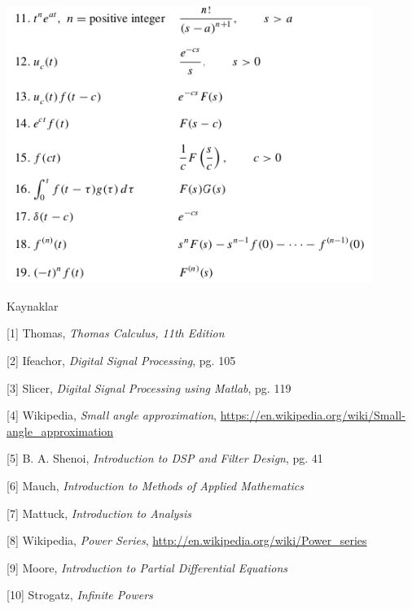 \documentclass[12pt,fleqn]{article}\usepackage{../../common}
\begin{document}
\includegraphics[height=9cm]{lap_2.png}

Kaynaklar 

[1] Thomas, {\em Thomas Calculus, 11th Edition}

[2] Ifeachor, {\em Digital Signal Processing}, pg. 105

[3] Slicer, {\em Digital Signal Processing using Matlab}, pg. 119

[4] Wikipedia, {\em Small angle approximation},
    \url{https://en.wikipedia.org/wiki/Small-angle_approximation}

[5] B. A. Shenoi, {\em Introduction to DSP and Filter Design}, pg. 41

[6] Mauch, {\em Introduction to Methods of Applied Mathematics}

[7] Mattuck, {\em Introduction to Analysis}

[8] Wikipedia, {\em Power Series}, \url{http://en.wikipedia.org/wiki/Power_series}

[9] Moore, {\em Introduction to Partial Differential Equations}

[10] Strogatz, {\em Infinite Powers}
\end{document}

